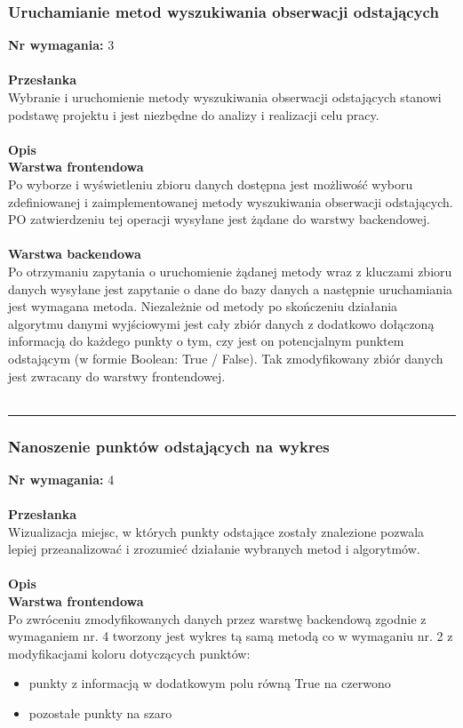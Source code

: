 \documentclass[eng,printmode]{mgr}
\begin{document}
\subsubsection{Uruchamianie metod wyszukiwania obserwacji odstających}
\textbf{Nr wymagania:} 3
\\\\
\textbf{Przesłanka}\\
Wybranie i uruchomienie metody wyszukiwania obserwacji odstających stanowi podstawę projektu i jest niezbędne do analizy i realizacji celu pracy.
\\\\
\textbf{Opis}\\
\textbf{Warstwa frontendowa}\\
Po wyborze i wyświetleniu zbioru danych dostępna jest możliwość wyboru zdefiniowanej i zaimplementowanej metody wyszukiwania obserwacji odstających. PO zatwierdzeniu tej operacji wysyłane jest żądane do warstwy backendowej.
\\\\
\textbf{Warstwa backendowa}\\
Po otrzymaniu zapytania o uruchomienie żądanej metody wraz z kluczami zbioru danych wysyłane jest zapytanie o dane do bazy danych a następnie uruchamiania jest wymagana metoda. Niezależnie od metody po skończeniu działania algorytmu danymi wyjściowymi jest cały zbiór danych z dodatkowo dołączoną informacją do każdego punkty o tym, czy jest on potencjalnym punktem odstającym (w formie Boolean: True / False). Tak zmodyfikowany zbiór danych jest zwracany do warstwy frontendowej.
\\\\\noindent\rule{\textwidth}{2pt}
\subsubsection{Nanoszenie punktów odstających na wykres}
\textbf{Nr wymagania:} 4
\\\\
\textbf{Przesłanka}\\
Wizualizacja miejsc, w których punkty odstające zostały znalezione pozwala lepiej przeanalizować i zrozumieć działanie wybranych metod i algorytmów.
\\\\
\textbf{Opis}\\
\textbf{Warstwa frontendowa}\\
Po zwróceniu zmodyfikowanych danych przez warstwę backendową zgodnie z wymaganiem nr. 4 tworzony jest wykres tą samą metodą co w wymaganiu nr. 2 z modyfikacjami koloru dotyczących punktów:
\begin{itemize}
  \item punkty z informacją w dodatkowym polu równą True na czerwono
  \item pozostałe punkty na szaro
\end{itemize}
\end{document}
